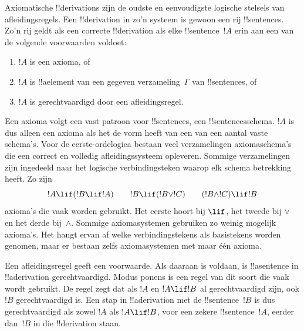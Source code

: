 \documentclass[openany]{memoir}
\begin{document}
\begingroup
\def\olfilename{OLP-0068}
\def\olfilepath{content/first-order-logic/proof-systems/}
\hypertarget{unit-OLP-0068}{}



      {}
      {}


Axiomatische !!{derivation}s zijn de oudste en eenvoudigste logische
stelsels van afleidingsregels. Een !!{derivation} in zo'n systeem is
gewoon een rij !!{sentence}s. Zo'n rij geldt als een correcte
!!{derivation} als elke !!{sentence}~$!A$ erin aan een van de volgende
voorwaarden voldoet:
\begin{enumerate}
\item $!A$ is een axioma, of
\item $!A$ is !!a{element} van een gegeven verzameling~$\Gamma$ van !!{sentence}s, of
\item $!A$ is gerechtvaardigd door een afleidingsregel.
\end{enumerate}
Een axioma volgt een vast patroon voor !!{sentence}s, een
!!{sentence}sschema. $!A$ is dus alleen een axioma als het de vorm heeft
van een van een aantal vaste schema's. Voor de eerste-ordelogica bestaan
veel verzamelingen axiomaschema's die een correct en volledig
afleidingssysteem opleveren. Sommige verzamelingen
zijn ingedeeld naar het logische verbindingsteken waarop elk schema
betrekking heeft. Zo zijn
\[
!A \lif (!B \lif !A) \qquad !B \lif (!B \lor !C) \qquad (!B \land !C) \lif !B
\]
axioma's die vaak worden gebruikt. Het eerste hoort bij $\lif$, het
tweede bij $\lor$ en het derde bij~$\land$.
Sommige axiomasystemen gebruiken zo weinig mogelijk axioma's. Het hangt
ervan af welke verbindingstekens als basistekens worden genomen, maar
er bestaan zelfs axiomasystemen met maar één axioma.

Een afleidingsregel geeft een voorwaarde. Als daaraan is voldaan, is
!!a{sentence} in !!a{derivation} gerechtvaardigd. Modus ponens is een
regel van dit soort die vaak wordt gebruikt. De regel zegt dat als $!A$
en $!A \lif !B$ al gerechtvaardigd zijn, ook $!B$ gerechtvaardigd is. Een stap
in !!a{derivation} met de !!{sentence}~$!B$ is dus gerechtvaardigd als
zowel $!A$ als $!A \lif !B$, voor een zekere !!{sentence}~$!A$, eerder
dan~$!B$ in die !!{derivation} staan.
\end{document}
